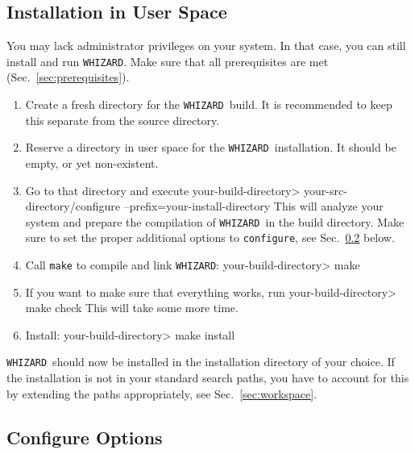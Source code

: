 \documentclass[12pt]{book}
\newenvironment{interaction}%
  {\begingroup\small
   \Verbatim}%
  {\endVerbatim
   \endgroup\noindent}
\newcommand{\ttt}[1]{\texttt{#1}}
\newcommand{\whizard}{\ttt{WHIZARD}}
\begin{document}
\subsection{Installation in User Space}
You may lack administrator privileges on your system.  In that case,
you can still install and run \whizard.  Make sure that all
prerequisites are met (Sec.~\ref{sec:prerequisites}).
\begin{enumerate}
\item
  Create a fresh directory for the \whizard\ build.  It is recommended
  to keep this separate from the source directory.
\item
  Reserve a directory in user space for the \whizard\ installation.
  It should be empty, or yet non-existent.
\item
  Go to that directory and execute
  \begin{interaction}
    your-build-directory> your-src-directory/configure
                               --prefix=your-install-directory
  \end{interaction}
  This will analyze your system and prepare the compilation of \whizard\
  in the build directory.  Make sure to set the proper additional options to
  \ttt{configure}, see Sec.~\ref{sec:configure-options} below.
\item
  Call \ttt{make} to compile and link \whizard:
  \begin{interaction}
    your-build-directory> make
  \end{interaction}
\item
  If you want to make sure that everything works, run
  \begin{interaction}
    your-build-directory> make check
  \end{interaction}
  This will take some more time.
\item
  Install:
  \begin{interaction}
    your-build-directory> make install
  \end{interaction}
\end{enumerate}
\whizard\ should now be installed in the installation directory of your
choice.  If the installation is not in your standard search paths, you
have to account for this by extending the paths appropriately, see
Sec.~\ref{sec:workspace}.


\subsection{Configure Options}
\label{sec:configure-options}
\end{document}
